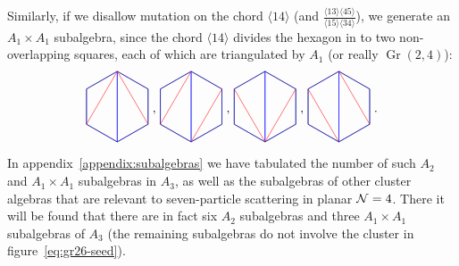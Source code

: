 \documentclass[11pt]{article}
\DeclareMathOperator{\Gr}{Gr}
\def\ket#1{\langle #1 \rangle}
\def\drawHexagon{
\coordinate (P1) at (90:1);
\coordinate (P2) at (30:1);
\coordinate (P3) at (330:1);
\coordinate (P4) at (270:1);
\coordinate (P5) at (210:1);
\coordinate (P6) at (150:1);
\draw (P1) -- (P2) -- (P3) -- (P4) -- (P5) -- (P6) -- cycle;
}
\begin{document}
Similarly, if we disallow mutation on the chord $\ket{14}$ (and $\frac{\ket{13}\ket{45}}{\ket{15}\ket{34}}$), we generate an $A_1 \times A_1$ subalgebra, since the chord $\ket{14}$ divides the hexagon in to two non-overlapping squares, each of which are triangulated by $A_1$ (or really $\Gr(2,4)$):
\begin{equation}
\begin{gathered}
\begin{tikzpicture}
	\drawHexagon
  	\draw[color=blue] (P1) -- (P2) -- (P3) -- (P4) -- cycle;
  	\draw[color=blue] (P1) -- (P4) -- (P5) -- (P6) -- cycle;
  	\draw[color=red] (P1) -- (P5);
  	\draw[color=red] (P1) -- (P3); 
\end{tikzpicture} 
\end{gathered}
{\ ,\ }
\begin{gathered}
\begin{tikzpicture}
  	\begin{scope}[xshift=2cm]
	\drawHexagon
  	\draw[color=blue] (P1) -- (P2) -- (P3) -- (P4) -- cycle;
  	\draw[color=blue] (P1) -- (P4) -- (P5) -- (P6) -- cycle;
  	\draw[color=red] (P1) -- (P5);
  	\draw[color=red] (P4) -- (P2);
	\end{scope}
\end{tikzpicture} 
\end{gathered}
{\ ,\ }
\begin{gathered}
\begin{tikzpicture}
	\begin{scope}[xshift=4cm]
	\drawHexagon
  	\draw[color=blue] (P1) -- (P2) -- (P3) -- (P4) -- cycle;
  	\draw[color=blue] (P1) -- (P4) -- (P5) -- (P6) -- cycle;
  	\draw[color=red] (P6) -- (P4);
  	\draw[color=red] (P4) -- (P2);
	\end{scope}
\end{tikzpicture} 
\end{gathered}
{\ ,\ }
\begin{gathered}
\begin{tikzpicture}
	\begin{scope}[xshift=6cm]
	\drawHexagon
  	\draw[color=blue] (P1) -- (P2) -- (P3) -- (P4) -- cycle;
  	\draw[color=blue] (P1) -- (P4) -- (P5) -- (P6) -- cycle;
  	\draw[color=red] (P6) -- (P4);
  	\draw[color=red] (P1) -- (P3);
	\end{scope}
\end{tikzpicture}
\end{gathered} \ .
\end{equation}
In appendix~\ref{appendix:subalgebras} we have tabulated the number of such $A_2$ and $A_1 \times A_1$ subalgebras in $A_3$, as well as the subalgebras of other cluster algebras that are relevant to seven-particle scattering in planar ${\cal N} = 4$. There it will be found that there are in fact six $A_2$ subalgebras and three $A_1 \times A_1$ subalgebras of $A_3$ (the remaining subalgebras do not involve the cluster in figure~\ref{eq:gr26-seed}).
\end{document}
